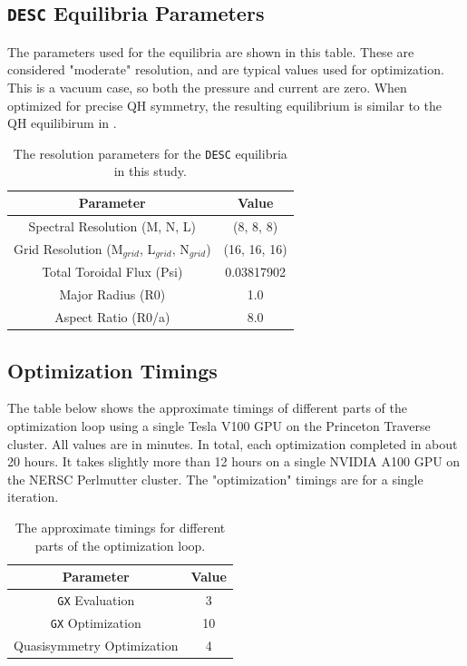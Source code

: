\documentclass{jpp}
\begin{document}
\subsection{{\tt DESC} Equilibria Parameters}
The parameters used for the equilibria are shown in this table. These are considered "moderate" resolution, and are typical values used for optimization. This is a vacuum case, so both the pressure and current are zero. When optimized for precise QH symmetry, the resulting equilibrium is similar to the QH equilibirum in \citep{Landreman2022MagneticConfinement}.
\begin{table}
\centering
    \begin{tabular}{cc}
     \hline
 Parameter & Value\\ [0.5ex] 
 \hline\hline
Spectral Resolution (M, N, L) & (8, 8, 8)\\
\hline
Grid Resolution (M$_{grid}$, L$_{grid}$, N$_{grid}$) & (16, 16, 16) \\
\hline
Total Toroidal Flux (Psi) & 0.03817902 \\
\hline
Major Radius (R0) & 1.0 \\
\hline
Aspect Ratio (R0/a) & 8.0 \\
\hline
    \end{tabular}
\caption{The resolution parameters for the {\tt DESC} equilibria in this study.}
\label{desc parameters}
\end{table}


\subsection{Optimization Timings}
The table below shows the approximate timings of different parts of the optimization loop using a single Tesla V100 GPU on the Princeton Traverse cluster. All values are in minutes. In total, each optimization completed in about 20 hours. It takes slightly more than 12 hours on a single NVIDIA A100 GPU on the NERSC Perlmutter cluster. The "optimization" timings are for a single iteration.
\begin{table}
\centering
    \begin{tabular}{cc}
     \hline
 Parameter & Value\\ [0.5ex] 
 \hline\hline
{\tt GX} Evaluation & 3\\
\hline
{\tt GX} Optimization & 10 \\
\hline
Quasisymmetry Optimization & 4 \\
\hline
    \end{tabular}
\caption{The approximate timings for different parts of the optimization loop.}
\label{timings}
\end{table}

\end{document}
